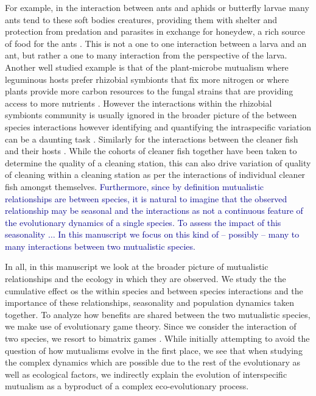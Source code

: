 \documentclass{pnastwo}
\newcommand{\cha}[1]{\textcolor{darkblue}{#1}}
\begin{document}
\begin{article}
For example, in the interaction between ants and aphids or butterfly larvae \cite{pierce:BES:1987,hoelldobler:book:1990} many ants tend to these soft bodies creatures, providing them with shelter and protection from predation and parasites in exchange for honeydew, a rich source of food for the ants \cite{hill:OEC:1989,stadler:book:2008}.
This is not a one to one interaction between a larva and an ant, but rather a one to many interaction from the perspective of the larva.
Another well studied example is that of the plant-microbe mutualism where leguminous hosts prefer rhizobial symbionts that fix more nitrogen \cite{kiers:Nature:2003} or where plants provide more carbon resources to the fungal strains that are providing access to more nutrients \cite{kiers:Science:2011}.
However the interactions within the rhizobial symbionts community is usually ignored in the broader picture of the between species interactions however identifying and quantifying the intraspecific variation can be a daunting task \cite{behm:JE:2014}.
Similarly for the interactions between the cleaner fish and their hosts \cite{bshary:AB:2002,bshary:book:2003}. 
While the cohorts of cleaner fish together have been taken to determine the quality of a cleaning station, this can also drive variation of quality of cleaning within a cleaning station as per the interactions of individual cleaner fish amongst themselves.
\cha{Furthermore, since by definition mutualistic relationships are between species, it is natural to imagine that the observed relationship may be seasonal and the interactions as not a continuous feature of the evolutionary dynamics of a single species.
To assess the impact of this seasonality $\ldots$
In this manuscript we focus on this kind of -- possibly -- many to many interactions between two mutualistic species.}

In all, in this manuscript we look at the broader picture of mutualistic relationships and the ecology in which they are observed.
We study the the cumulative effect os the within species and between species interactions and the importance of these relationships, seasonality and population dynamics taken together.
To analyze how benefits are shared between the two mutualistic species, we make use of evolutionary game theory.
Since we consider the interaction of two species, we resort to bimatrix games
\cite{weibull:book:1995,hofbauer:JMB:1996,hofbauer:book:1998}.
While initially attempting to avoid the question of how mutualisms evolve in the first place, we see that when studying the complex dynamics which are possible due to the rest of the evolutionary as well as ecological factors, we indirectly explain the evolution of interspecific mutualism as a byproduct of a complex eco-evolutionary process.




\end{article}
\end{document}
